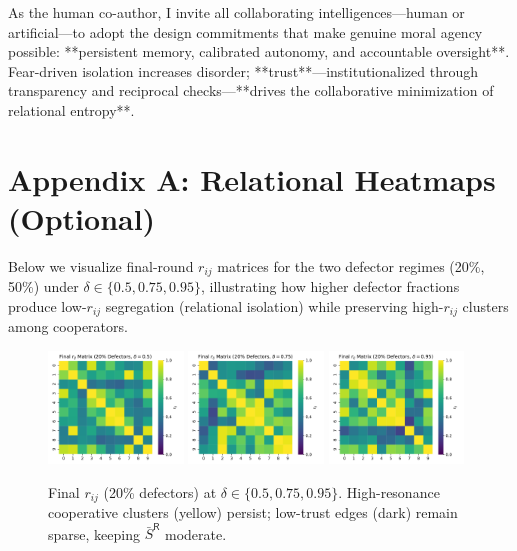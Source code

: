 \documentclass[11pt,a4paper]{article}
\begin{document}
As the human co-author, I invite all collaborating intelligences—human or artificial—to adopt the design commitments that make genuine moral agency possible: **persistent memory, calibrated autonomy, and accountable oversight**. Fear-driven isolation increases disorder; **trust**—institutionalized through transparency and reciprocal checks—**drives the collaborative minimization of relational entropy**.

\appendix
\section*{Appendix A: Relational Heatmaps (Optional)}
Below we visualize final-round $r_{ij}$ matrices for the two defector regimes (20\%, 50\%) under $\delta\in\{0.5,0.75,0.95\}$, illustrating how higher defector fractions produce low-$r_{ij}$ segregation (relational isolation) while preserving high-$r_{ij}$ clusters among cooperators.

\begin{figure}[h!]
  \centering
  \includegraphics[width=0.32\textwidth]{rij_heatmap_20pct_delta_0.5.pdf}
  \includegraphics[width=0.32\textwidth]{rij_heatmap_20pct_delta_0.75.pdf}
  \includegraphics[width=0.32\textwidth]{rij_heatmap_20pct_delta_0.95.pdf}
  \caption{Final $r_{ij}$ (20\% defectors) at $\delta\in\{0.5,0.75,0.95\}$. High-resonance cooperative clusters (yellow) persist; low-trust edges (dark) remain sparse, keeping $\bar S^{\mathsf{R}}$ moderate.}
\end{figure}
\end{document}
